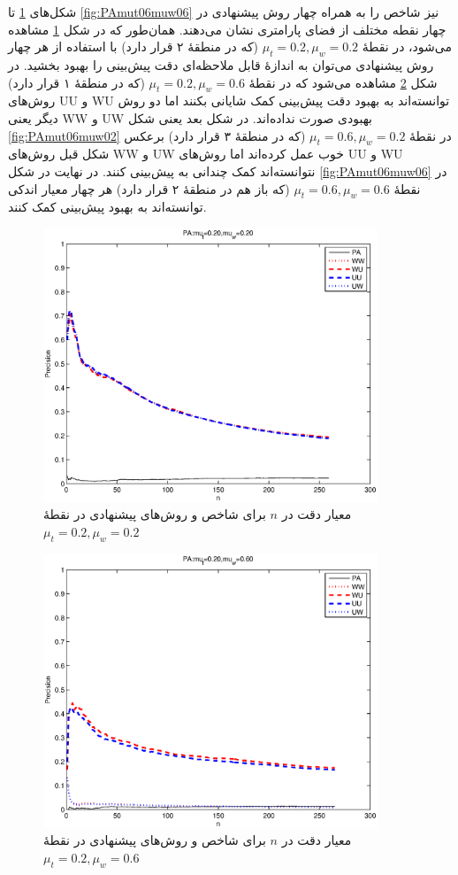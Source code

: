 شکل‌های \ref{fig:PAmut02muw02} تا \ref{fig:PAmut06muw06} نیز شاخص  را به همراه چهار روش پیشنهادی در چهار نقطه مختلف از فضای پارامتری نشان می‌دهند. همان‌طور که در شکل \ref{fig:PAmut02muw02} مشاهده می‌شود، در نقطهٔ $\mu_t=0.2,\mu_w=0.2$ (که در منطقهٔ ۲ قرار دارد) با استفاده از هر چهار روش پیشنهادی می‌توان به اندازهٔ قابل ملاحظه‌ای دقت پیش‌بینی را بهبود بخشید. در شکل \ref{fig:PAmut02muw06} مشاهده می‌شود که در نقطهٔ $\mu_t=0.2,\mu_w=0.6$ (که در منطقهٔ ۱ قرار دارد) روش‌های UU و WU توانسته‌اند به بهبود دقت پیش‌بینی کمک شایانی بکنند اما دو روش دیگر یعنی WW و UW بهبودی صورت نداده‌اند. در شکل بعد یعنی شکل \ref{fig:PAmut06muw02} در نقطهٔ $\mu_t=0.6,\mu_w=0.2$ (که در منطقهٔ ۳ قرار دارد) برعکس شکل قبل روش‌های WW و UW خوب عمل کرده‌اند اما روش‌های UU و WU نتوانسته‌اند کمک چندانی به پیش‌بینی کنند. در نهایت در شکل \ref{fig:PAmut06muw06}  در نقطهٔ $\mu_t=0.6,\mu_w=0.6$ (که باز هم در منطقهٔ ۲ قرار دارد) هر چهار معیار اندکی توانسته‌اند به بهبود پیش‌بینی کمک کنند.
\begin{figure}[!htb]
  \begin{center}
    \includegraphics[width=10cm]{PAmut02muw02.eps}
    \caption{معیار دقت در $n$ برای شاخص  و روش‌های پیشنهادی در نقطهٔ $\mu_t=0.2,\mu_w=0.2$}
    \label{fig:PAmut02muw02}
  \end{center}
\end{figure}
\begin{figure}[!htb]
  \begin{center}
    \includegraphics[width=10cm]{PAmut02muw06.eps}
    \caption{معیار دقت در $n$ برای شاخص  و روش‌های پیشنهادی در نقطهٔ $\mu_t=0.2,\mu_w=0.6$}
    \label{fig:PAmut02muw06}
  \end{center}
\end{figure}
